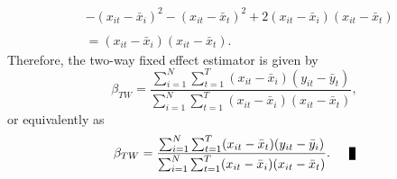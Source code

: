 \documentclass{article}[12pt]
\newenvironment{proof}[1][Proof.]{\begin{trivlist}
\item[\hskip \labelsep {\bfseries #1}]}{\end{trivlist}}
\newcommand{\qed}{\nobreak \ifvmode \relax \else
      \ifdim\lastskip<1.5em \hskip-\lastskip
      \hskip1.5em plus0em minus0.5em \fi \nobreak
      \vrule height0.75em width0.5em depth0.25em\fi}
\begin{document}
\begin{proof}
\begin{align}
& - (x_{it}  - \bar{x}_i)^2 - (x_{it}  - \bar{x}_t)^2 + 2(x_{it}  - \bar{x}_i)(x_{it}  - \bar{x}_t)\nonumber\\
&\nonumber\\
&=(x_{it}  - \bar{x}_i)(x_{it}  - \bar{x}_t).
\end{align}
Therefore, the two-way fixed effect estimator is given by
\begin{equation}
\beta_{TW} = \frac{\sum_{i=1}^N \sum_{t=1}^T(x_{it}  - \bar{x}_i)(y_{it} - \bar{y}_t)}{\sum_{i=1}^N \sum_{t=1}^T(x_{it}  - \bar{x}_i)(x_{it} - \bar{x}_t)},
\end{equation}
or equivalently as
\begin{equation}
\beta_{TW} = \frac{\sum_{i=1}^N \sum_{t=1}^T(x_{it}  - \bar{x}_t)(y_{it} - \bar{y}_i)}{\sum_{i=1}^N \sum_{t=1}^T(x_{it}  - \bar{x}_i)(x_{it} - \bar{x}_t)}.\qed
\end{equation}
\end{proof}
\end{document}
